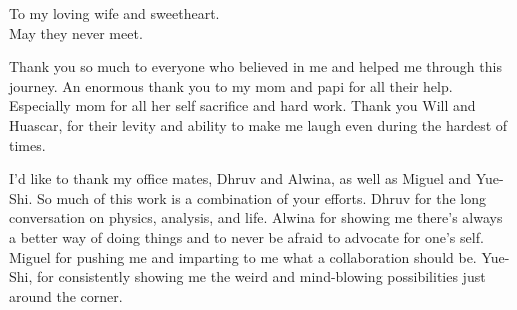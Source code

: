 \documentclass{ucbthesis}
\begin{document}
\begin{frontmatter}

\begin{dedication}
\begin{center}
\vfil\null
To my loving wife and sweetheart.\\\vspace{12pt}
May they never meet.

\end{center}
\vfil\null
\end{dedication}


\tableofcontents
\clearpage
\listoffigures
\clearpage
\listoftables


\begin{acknowledgements}
Thank you so much to everyone who believed in me and helped me through this journey.
An enormous thank you to my mom and papi for all their help. Especially mom for all her self sacrifice and hard work. Thank you Will and Huascar, for their levity  and ability to make me laugh even during the hardest of times. 

I'd like to thank my office mates, Dhruv and Alwina, as well as Miguel and Yue-Shi. So much of this work is a combination of your efforts. Dhruv for the long conversation on physics, analysis, and life. Alwina for showing me there's always a better way of doing things and to never be afraid to advocate for one's self. Miguel for pushing me and imparting to me what a collaboration should be. Yue-Shi, for consistently showing me the weird and mind-blowing possibilities just around the corner. 


\end{acknowledgements}
\end{frontmatter}
\end{document}

